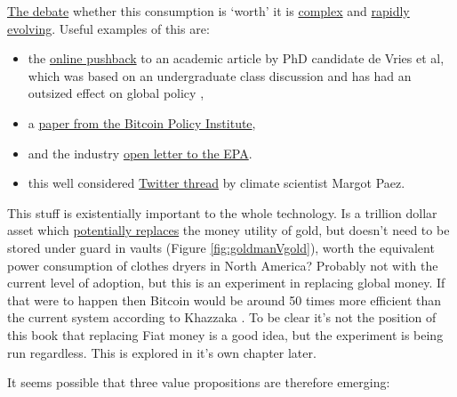 \href{https://www.youtube.com/watch?v=6LP8G-oZnEs}{The debate} whether this consumption is `worth' it is \href{https://www.utilitydive.com/news/bitcoin-mining-as-a-grid-resource-its-complicated/617896/}{complex} and \href{https://www.aei.org/technology-and-innovation/no-hearing-on-bitcoins-energy-use-is-complete-without-nic-carter/}{rapidly evolving}. Useful examples of this are:
\begin{itemize}
\item the \href{https://www.zerohedge.com/crypto/questionable-ethics-anti-bitcoin-esg-junk-science}{online pushback} to an academic article by PhD candidate de Vries et al, which was based on an undergraduate class discussion and has had an outsized effect on global policy \cite{de2022revisiting}, 
\item a \href{https://rebrand.ly/v8qq1sx}{paper from the Bitcoin Policy Institute}, 
\item and the industry \href{https://bitcoinminingcouncil.com/wp-content/uploads/2022/05/Bitcoin_Letter_to_the_Environmental_Protection_Agency.pdf}{open letter to the EPA}.\par
\item this well considered \href{https://twitter.com/jyn_urso/status/1508899761319038983}{Twitter thread} by climate scientist Margot Paez.
\end{itemize}
This stuff is existentially important to the whole technology. Is a trillion dollar asset which \href{https://www.theheldreport.com/p/bitcoin-vs-gold}{potentially replaces} the money utility of gold, but doesn't need to be stored under guard in vaults (Figure \ref{fig:goldmanVgold}), worth the equivalent power consumption of clothes dryers in North America? Probably not with the current level of adoption, but this is an experiment in replacing global money. If that were to happen then Bitcoin would be around 50 times more efficient than the current system according to Khazzaka \cite{khazzaka2022bitcoin}. To be clear it's not the position of this book that replacing Fiat money is a good idea, but the experiment is being run regardless. This is explored in it's own chapter later.\par
It seems possible that three value propositions are therefore emerging:
